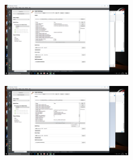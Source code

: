 \documentclass[a4paper,10pt]{article}
\begin{document}
\begin{minipage}{0.5\linewidth}
\begin{figure}[H]
\begin{center}
\includegraphics[width=5.5cm]{fig9.png}
\vspace*{-1mm}
\caption{\small  \label{fig:9}}
\end{center}
\end{figure}
\end{minipage}
\begin{minipage}{0.5\linewidth}
\begin{figure}[H]
\begin{center}
\includegraphics[width=5.5cm]{fig10.png}
\vspace*{-1mm}
\caption{\small  \label{fig:10}}
\end{center}
\end{figure}
\end{minipage}
\end{document}
